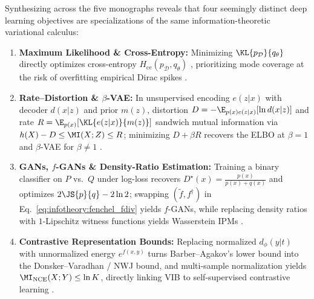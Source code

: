 \documentclass[../../../../master.tex]{subfiles}
\begin{document}
\begin{crossbook}
\label{cb:infotheory:synthesis}
Synthesizing across the five monographs reveals that four seemingly distinct deep learning objectives are specializations of the same information-theoretic variational calculus:
\begin{enumerate}[leftmargin=1.4em]
  \item \textbf{Maximum Likelihood \& Cross-Entropy:} Minimizing $\KL{p_{\mathcal{D}}}{q_\theta}$ directly optimizes cross-entropy $H_{\mathrm{ce}}(p_{\mathcal{D}}, q_\theta)$  , prioritizing mode coverage at the risk of overfitting empirical Dirac spikes .
  \item \textbf{Rate--Distortion \& $\beta$-VAE:} In unsupervised encoding $e(z|x)$ with decoder $d(x|z)$ and prior $m(z)$, distortion $D = -\E_{p(x)e(z|x)}[\ln d(x|z)]$ and rate $R = \E_{p(x)}[\KL{e(z|x)}{m(z)}]$ sandwich mutual information via $h(X) - D \le \MI(X; Z) \le R$; minimizing $D + \beta R$ recovers the ELBO at $\beta = 1$ and $\beta$-VAE for $\beta \ne 1$ .
  \item \textbf{GANs, $f$-GANs \& Density-Ratio Estimation:} Training a binary classifier on $P$ vs.\ $Q$ under log-loss recovers $D^\star(x) = \frac{p(x)}{p(x)+q(x)}$ and optimizes $2\JS{p}{q} - 2\ln 2$; swapping $(\tilde{f}, f^\dagger)$ in Eq.~\eqref{eq:infotheory:fenchel_fdiv} yields $f$-GANs, while replacing density ratios with $1$-Lipschitz witness functions yields Wasserstein IPMs  .
  \item \textbf{Contrastive Representation Bounds:} Replacing normalized $d_\phi(y|t)$ with unnormalized energy $e^{f(x,y)}$ turns Barber--Agakov's lower bound into the Donsker--Varadhan / NWJ bound, and multi-sample normalization yields $\MI_{\mathrm{NCE}}(X; Y) \le \ln K$, directly linking VIB to self-supervised contrastive learning .
\end{enumerate}
\end{crossbook}
\end{document}

